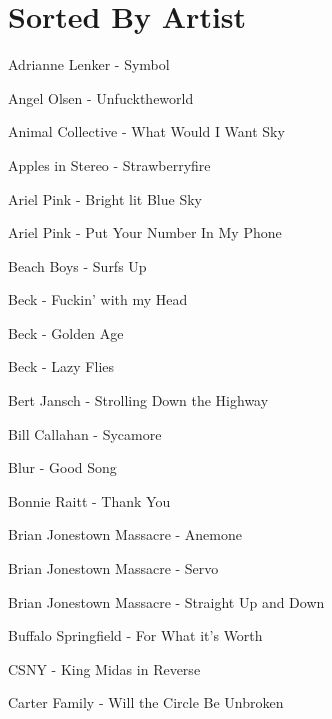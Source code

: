 \section*{Sorted By Artist}
Adrianne Lenker - Symbol \dotfill \pageref{Symbol - Adrianne Lenker} 

Angel Olsen - Unfucktheworld \dotfill \pageref{Unfucktheworld - Angel Olsen} 

Animal Collective - What Would I Want Sky \dotfill \pageref{What Would I Want Sky - Animal Collective} 

Apples in Stereo - Strawberryfire \dotfill \pageref{Strawberryfire - Apples in Stereo} 

Ariel Pink - Bright lit Blue Sky \dotfill \pageref{Bright lit Blue Sky - Ariel Pink} 

Ariel Pink - Put Your Number In My Phone \dotfill \pageref{Put Your Number In My Phone - Ariel Pink} 

Beach Boys - Surfs Up \dotfill \pageref{Surfs Up - Beach Boys} 

Beck - Fuckin' with my Head \dotfill \pageref{Fuckin' with my Head - Beck} 

Beck - Golden Age \dotfill \pageref{Golden Age - Beck} 

Beck - Lazy Flies \dotfill \pageref{Lazy Flies - Beck} 

Bert Jansch - Strolling Down the Highway \dotfill \pageref{Strolling Down the Highway - Bert Jansch} 

Bill Callahan - Sycamore \dotfill \pageref{Sycamore - Bill Callahan} 

Blur - Good Song \dotfill \pageref{Good Song - Blur} 

Bonnie Raitt - Thank You \dotfill \pageref{Thank You - Bonnie Raitt} 

Brian Jonestown Massacre - Anemone \dotfill \pageref{Anemone - Brian Jonestown Massacre} 

Brian Jonestown Massacre - Servo \dotfill \pageref{Servo - Brian Jonestown Massacre} 

Brian Jonestown Massacre - Straight Up and Down \dotfill \pageref{Straight Up and Down - Brian Jonestown Massacre} 

Buffalo Springfield - For What it's Worth \dotfill \pageref{For What it's Worth - Buffalo Springfield} 

CSNY - King Midas in Reverse \dotfill \pageref{King Midas in Reverse - CSNY} 

Carter Family - Will the Circle Be Unbroken \dotfill \pageref{Will the Circle Be Unbroken - Carter Family} 

